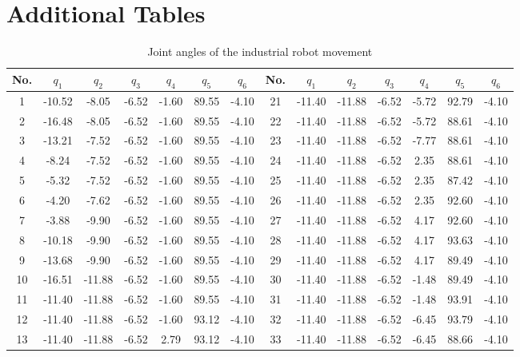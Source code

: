\documentclass[lettersize,onecolumn]{IEEEtran}
\begin{document}
	\section{Additional Tables}
	\renewcommand{\thetable}{S.I}
\begin{table}[!htb]
	\caption{Joint angles of the industrial robot movement}
	\label{tab1}
	\centering
	\footnotesize
	\begin{tabular*}{\textwidth}{@{\extracolsep{\fill}}c cccccc|c cccccc}
		\toprule
		No. & \(q_1\) & \(q_2\) & \(q_3\) & \(q_4\) & \(q_5\) & \(q_6\) & No. & \(q_1\) & \(q_2\) & \(q_3\) & \(q_4\) & \(q_5\) & \(q_6\) \\
		\midrule
		1  & -10.52 & -8.05 & -6.52 & -1.60 & 89.55 & -4.10 & 21 & -11.40 & -11.88 & -6.52 & -5.72 & 92.79 & -4.10 \\
		2  & -16.48 & -8.05 & -6.52 & -1.60 & 89.55 & -4.10 & 22 & -11.40 & -11.88 & -6.52 & -5.72 & 88.61 & -4.10 \\
		3  & -13.21 & -7.52 & -6.52 & -1.60 & 89.55 & -4.10 & 23 & -11.40 & -11.88 & -6.52 & -7.77 & 88.61 & -4.10 \\
		4  & -8.24  & -7.52 & -6.52 & -1.60 & 89.55 & -4.10 & 24 & -11.40 & -11.88 & -6.52 & 2.35  & 88.61 & -4.10 \\
		5  & -5.32  & -7.52 & -6.52 & -1.60 & 89.55 & -4.10 & 25 & -11.40 & -11.88 & -6.52 & 2.35  & 87.42 & -4.10 \\
		6  & -4.20  & -7.62 & -6.52 & -1.60 & 89.55 & -4.10 & 26 & -11.40 & -11.88 & -6.52 & 2.35  & 92.60 & -4.10 \\
		7  & -3.88  & -9.90 & -6.52 & -1.60 & 89.55 & -4.10 & 27 & -11.40 & -11.88 & -6.52 & 4.17  & 92.60 & -4.10 \\
		8  & -10.18 & -9.90 & -6.52 & -1.60 & 89.55 & -4.10 & 28 & -11.40 & -11.88 & -6.52 & 4.17  & 93.63 & -4.10 \\
		9  & -13.68 & -9.90 & -6.52 & -1.60 & 89.55 & -4.10 & 29 & -11.40 & -11.88 & -6.52 & 4.17  & 89.49 & -4.10 \\
		10 & -16.51 & -11.88 & -6.52 & -1.60 & 89.55 & -4.10 & 30 & -11.40 & -11.88 & -6.52 & -1.48 & 89.49 & -4.10 \\
		11 & -11.40 & -11.88 & -6.52 & -1.60 & 89.55 & -4.10 & 31 & -11.40 & -11.88 & -6.52 & -1.48 & 93.91 & -4.10 \\
		12 & -11.40 & -11.88 & -6.52 & -1.60 & 93.12 & -4.10 & 32 & -11.40 & -11.88 & -6.52 & -6.45 & 93.79 & -4.10 \\
		13 & -11.40 & -11.88 & -6.52 & 2.79  & 93.12 & -4.10 & 33 & -11.40 & -11.88 & -6.52 & -6.45 & 88.66 & -4.10 \\

\end{tabular*}
\end{table}
\end{document}
